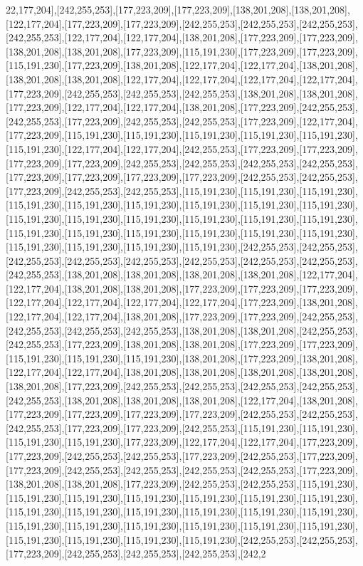 22,177,204],[242,255,253],[177,223,209],[177,223,209],[138,201,208],[138,201,208],[122,177,204],[177,223,209],[177,223,209],[242,255,253],[242,255,253],[242,255,253],[242,255,253],[122,177,204],[122,177,204],[138,201,208],[177,223,209],[177,223,209],[138,201,208],[138,201,208],[177,223,209],[115,191,230],[177,223,209],[177,223,209],[115,191,230],[177,223,209],[138,201,208],[122,177,204],[122,177,204],[138,201,208],[138,201,208],[138,201,208],[122,177,204],[122,177,204],[122,177,204],[122,177,204],[177,223,209],[242,255,253],[242,255,253],[242,255,253],[138,201,208],[138,201,208],[177,223,209],[122,177,204],[122,177,204],[138,201,208],[177,223,209],[242,255,253],[242,255,253],[177,223,209],[242,255,253],[242,255,253],[177,223,209],[122,177,204],[177,223,209],[115,191,230],[115,191,230],[115,191,230],[115,191,230],[115,191,230],[115,191,230],[122,177,204],[122,177,204],[242,255,253],[177,223,209],[177,223,209],[177,223,209],[177,223,209],[242,255,253],[242,255,253],[242,255,253],[242,255,253],[177,223,209],[177,223,209],[177,223,209],[177,223,209],[242,255,253],[242,255,253],[177,223,209],[242,255,253],[242,255,253],[115,191,230],[115,191,230],[115,191,230],[115,191,230],[115,191,230],[115,191,230],[115,191,230],[115,191,230],[115,191,230],[115,191,230],[115,191,230],[115,191,230],[115,191,230],[115,191,230],[115,191,230],[115,191,230],[115,191,230],[115,191,230],[115,191,230],[115,191,230],[115,191,230],[115,191,230],[115,191,230],[115,191,230],[115,191,230],[242,255,253],[242,255,253],[242,255,253],[242,255,253],[242,255,253],[242,255,253],[242,255,253],[242,255,253],[242,255,253],[138,201,208],[138,201,208],[138,201,208],[138,201,208],[122,177,204],[122,177,204],[138,201,208],[138,201,208],[177,223,209],[177,223,209],[177,223,209],[122,177,204],[122,177,204],[122,177,204],[122,177,204],[177,223,209],[138,201,208],[122,177,204],[122,177,204],[138,201,208],[177,223,209],[177,223,209],[242,255,253],[242,255,253],[242,255,253],[242,255,253],[138,201,208],[138,201,208],[242,255,253],[242,255,253],[177,223,209],[138,201,208],[138,201,208],[177,223,209],[177,223,209],[115,191,230],[115,191,230],[115,191,230],[138,201,208],[177,223,209],[138,201,208],[122,177,204],[122,177,204],[138,201,208],[138,201,208],[138,201,208],[138,201,208],[138,201,208],[177,223,209],[242,255,253],[242,255,253],[242,255,253],[242,255,253],[242,255,253],[138,201,208],[138,201,208],[138,201,208],[122,177,204],[138,201,208],[177,223,209],[177,223,209],[177,223,209],[177,223,209],[242,255,253],[242,255,253],[242,255,253],[177,223,209],[177,223,209],[242,255,253],[115,191,230],[115,191,230],[115,191,230],[115,191,230],[177,223,209],[122,177,204],[122,177,204],[177,223,209],[177,223,209],[242,255,253],[242,255,253],[177,223,209],[242,255,253],[177,223,209],[177,223,209],[242,255,253],[242,255,253],[242,255,253],[242,255,253],[177,223,209],[138,201,208],[138,201,208],[177,223,209],[242,255,253],[242,255,253],[115,191,230],[115,191,230],[115,191,230],[115,191,230],[115,191,230],[115,191,230],[115,191,230],[115,191,230],[115,191,230],[115,191,230],[115,191,230],[115,191,230],[115,191,230],[115,191,230],[115,191,230],[115,191,230],[115,191,230],[115,191,230],[115,191,230],[115,191,230],[115,191,230],[115,191,230],[115,191,230],[242,255,253],[242,255,253],[177,223,209],[242,255,253],[242,255,253],[242,255,253],[242,2